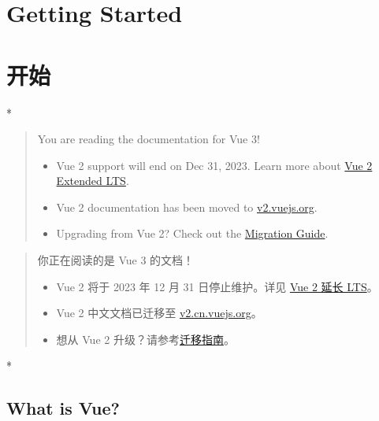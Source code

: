
\begin{paracol}{2}
\section{Getting Started}
\switchcolumn
\section{开始}
\switchcolumn[0]*%
\begin{quote}%
You are reading the documentation for Vue 3!    
\begin{itemize}
    \item
      Vue 2 support will end on Dec 31, 2023. Learn more about
      \href{https://v2.vuejs.org/lts/}{Vue 2 Extended LTS}.
    \item
      Vue 2 documentation has been moved to
      \href{https://v2.vuejs.org/}{v2.vuejs.org}.
    \item
      Upgrading from Vue 2? Check out the
      \href{https://v3-migration.vuejs.org/}{Migration Guide}.
    \end{itemize}
\end{quote}
\switchcolumn
\begin{quote}
你正在阅读的是 Vue 3 的文档！    
\begin{itemize}
\item
    Vue 2 将于 2023 年 12 月 31 日停止维护。详见
    \href{https://v2.vuejs.org/lts/}{Vue 2 延长 LTS}。
\item
    Vue 2 中文文档已迁移至
    \href{https://v2.cn.vuejs.org/}{v2.cn.vuejs.org}。
\item
    想从 Vue 2
    升级？请参考\href{https://v3-migration.vuejs.org/}{迁移指南}。
\end{itemize}
\end{quote}
\switchcolumn[0]*%
\subsection{What is Vue?}
\switchcolumn

\end{paracol}
